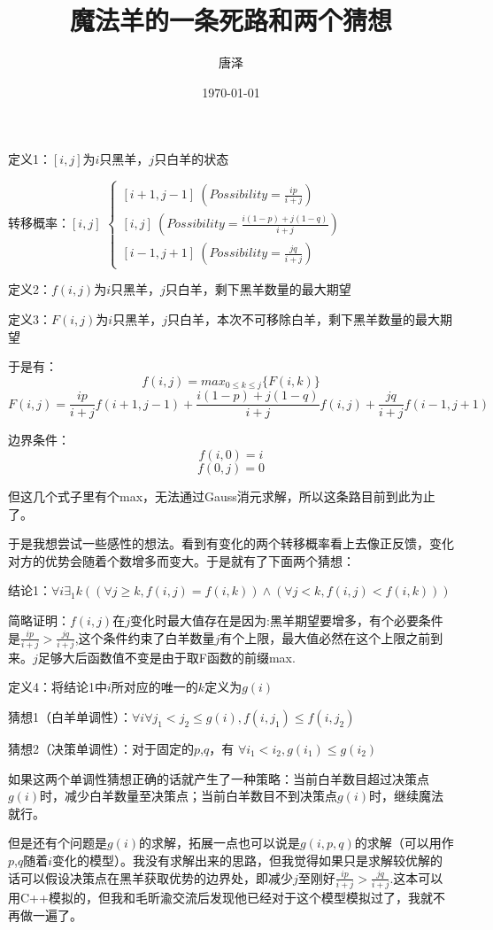 \documentclass{article}
\title{魔法羊的一条死路和两个猜想}
\author{唐泽}
\date{\today}
\begin{document}
\maketitle

定义1：$[i,j]$为$i$只黑羊，$j$只白羊的状态

转移概率：$[i,j]$
$\begin{cases}
[i+1,j-1] \ (Possibility=\frac{ip}{i+j})\\
[i,j] \ (Possibility=\frac{i(1-p)+j(1-q)}{i+j})\\
[i-1,j+1] \ (Possibility=\frac{jq}{i+j})
\end{cases}$

定义2：$f(i,j)$为$i$只黑羊，$j$只白羊，剩下黑羊数量的最大期望

定义3：$F(i,j)$为$i$只黑羊，$j$只白羊，本次不可移除白羊，剩下黑羊数量的最大期望

于是有：
$$f(i,j)=max_{0\le k\le j}\{F(i,k)\}$$
$$F(i,j)=\frac{ip}{i+j}f(i+1,j-1)+\frac{i(1-p)+j(1-q)}{i+j}f(i,j)+\frac{jq}{i+j}f(i-1,j+1)$$

边界条件：
$$f(i,0)=i$$
$$f(0,j)=0$$

但这几个式子里有个max，无法通过Gauss消元求解，所以这条路目前到此为止了。

于是我想尝试一些感性的想法。看到有变化的两个转移概率看上去像正反馈，变化对方的优势会随着个数增多而变大。于是就有了下面两个猜想：

结论1：$\forall i\exists_1 k ((\forall j\ge k,f(i,j)=f(i,k)) \wedge (\forall j<k,f(i,j)<f(i,k)))$

简略证明：$f(i,j)$在$j$变化时最大值存在是因为:黑羊期望要增多，有个必要条件是$\frac{ip}{i+j}>\frac{jq}{i+j}$,这个条件约束了白羊数量$j$有个上限，最大值必然在这个上限之前到来。$j$足够大后函数值不变是由于取F函数的前缀max.

定义4：将结论1中$i$所对应的唯一的$k$定义为$g(i)$

猜想1（白羊单调性）：$\forall i\forall j_1<j_2\le g(i), f(i,j_1)\le f(i,j_2)$ 

猜想2（决策单调性）：对于固定的$p$,$q$，有 $\forall i_1<i_2, g(i_1)\le g(i_2)$

如果这两个单调性猜想正确的话就产生了一种策略：当前白羊数目超过决策点$g(i)$时，减少白羊数量至决策点；当前白羊数目不到决策点$g(i)$时，继续魔法就行。

但是还有个问题是$g(i)$的求解，拓展一点也可以说是$g(i,p,q)$的求解（可以用作$p$,$q$随着$i$变化的模型）。我没有求解出来的思路，但我觉得如果只是求解较优解的话可以假设决策点在黑羊获取优势的边界处，即减少$j$至刚好$\frac{ip}{i+j}>\frac{jq}{i+j}$.这本可以用C++模拟的，但我和毛昕渝交流后发现他已经对于这个模型模拟过了，我就不再做一遍了。
\end{document}
